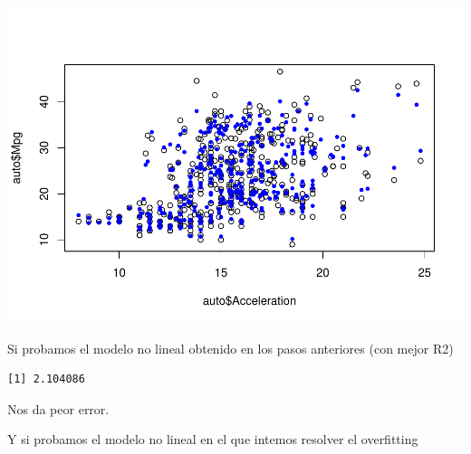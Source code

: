 \documentclass[
]{article}
\newenvironment{Shaded}{\begin{snugshade}}{\end{snugshade}}
\newcommand{\CommentTok}[1]{\textcolor[rgb]{0.56,0.35,0.01}{\textit{#1}}}
\newcommand{\DecValTok}[1]{\textcolor[rgb]{0.00,0.00,0.81}{#1}}
\newcommand{\KeywordTok}[1]{\textcolor[rgb]{0.13,0.29,0.53}{\textbf{#1}}}
\newcommand{\NormalTok}[1]{#1}
\newcommand{\OperatorTok}[1]{\textcolor[rgb]{0.81,0.36,0.00}{\textbf{#1}}}
\newcommand{\StringTok}[1]{\textcolor[rgb]{0.31,0.60,0.02}{#1}}
\begin{document}
\begin{center}\includegraphics{Regresion_files/figure-latex/unnamed-chunk-29-2} \end{center}

Si probamos el modelo no lineal obtenido en los pasos anteriores (con
mejor R2)

\begin{Shaded}
\end{Shaded}

\begin{verbatim}
[1] 2.104086
\end{verbatim}

Nos da peor error.

Y si probamos el modelo no lineal en el que intemos resolver el
overfitting
\end{document}
